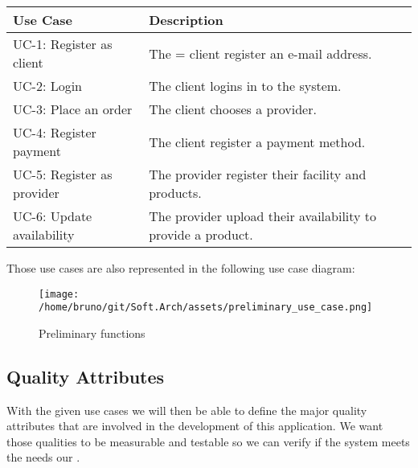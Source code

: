\begin{table}[H]
    \begin{tabularx}{\textwidth}{lX}
    \toprule
    Use Case & Description  \\
    \midrule
    UC-1: Register as \gls{client} & The = \gls{client} register an e-mail address.\\
    UC-2: Login & The \gls{client} logins in to the system. \\
    UC-3: Place an order & The \gls{client} chooses a \gls{provider}. \\
    UC-4: Register payment & The \gls{client} register a payment method. \\
    UC-5: Register as \gls{provider} & The \gls{provider} register their facility and products. \\
    UC-6: Update availability & The \gls{provider} upload their availability to provide a product. \\
    \bottomrule
    \end{tabularx}
\end{table}

Those use cases are also represented in the following use case diagram:

\begin{figure}[H]
    \centering
    \texttt{[image: /home/bruno/git/Soft.Arch/assets/preliminary\_use\_case.png]}
    \caption{Preliminary functions}
    \label{fig:preliminary_use_case}
\end{figure}


\subsection{Quality Attributes}

With the given use cases we will then be able to define the major quality attributes that are involved in the 
development of this application. We want those qualities to be measurable and testable so we can verify if the 
system meets the needs our  \cite{refbook:DSHC}.


